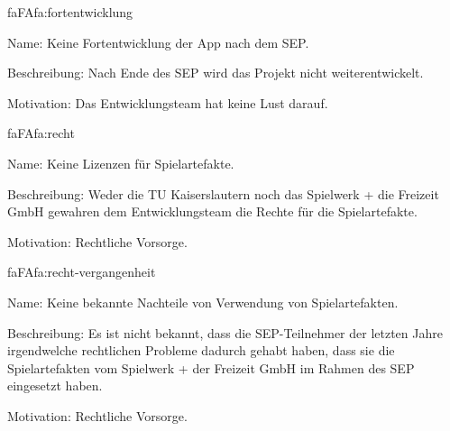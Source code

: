 \setcounter{fa}{10}

\begin{description}[leftmargin=5em, style=sameline]
	
	\begin{lhp}{fa}{FA}{fa:fortentwicklung}
		\item [Name:] Keine Fortentwicklung der App nach dem SEP.
		\item [Beschreibung:] Nach Ende des SEP wird das Projekt nicht weiterentwickelt.
		\item [Motivation:] Das Entwicklungsteam hat keine Lust darauf.
	\end{lhp}
	
	\begin{lhp}{fa}{FA}{fa:recht}
		\item [Name:] Keine Lizenzen für Spielartefakte.
		\item [Beschreibung:] Weder die TU Kaiserslautern noch das Spielwerk + die Freizeit GmbH gewahren dem Entwicklungsteam die Rechte für die Spielartefakte.
		\item [Motivation:] Rechtliche Vorsorge.
	\end{lhp}
	
	\begin{lhp}{fa}{FA}{fa:recht-vergangenheit}
		\item [Name:] Keine bekannte Nachteile von Verwendung von Spielartefakten.
		\item [Beschreibung:] Es ist nicht bekannt, dass die SEP-Teilnehmer der letzten Jahre irgendwelche rechtlichen Probleme dadurch gehabt haben, dass sie die Spielartefakten vom Spielwerk + der Freizeit GmbH im Rahmen des SEP eingesetzt haben.
		\item [Motivation:] Rechtliche Vorsorge.
	\end{lhp}
	
	
\end{description}

